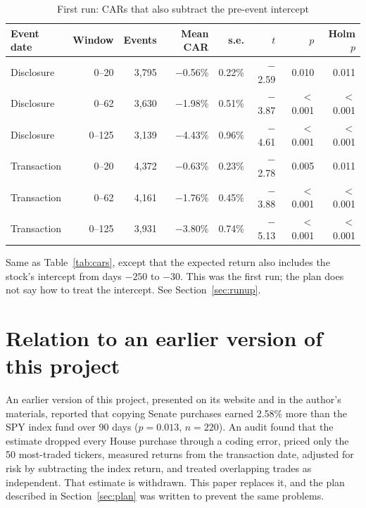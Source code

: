 \documentclass[11pt]{article}
\newcommand{\m}{\ensuremath{-}}
\begin{document}
\begin{table}[H]
\centering
\caption{First run: CARs that also subtract the pre-event intercept}\label{tab:firstrun}
\begin{tabular}{lrrrrrrr}
\toprule
Event date & Window & Events & Mean CAR & s.e. & $t$ & $p$ & Holm $p$ \\
\midrule
Disclosure & 0--20 & 3,795 & \m0.56\% & 0.22\% & \m2.59 & 0.010 & 0.011 \\
Disclosure & 0--62 & 3,630 & \m1.98\% & 0.51\% & \m3.87 & $<$0.001 & $<$0.001 \\
Disclosure & 0--125 & 3,139 & \m4.43\% & 0.96\% & \m4.61 & $<$0.001 & $<$0.001 \\
Transaction & 0--20 & 4,372 & \m0.63\% & 0.23\% & \m2.78 & 0.005 & 0.011 \\
Transaction & 0--62 & 4,161 & \m1.76\% & 0.45\% & \m3.88 & $<$0.001 & $<$0.001 \\
Transaction & 0--125 & 3,931 & \m3.80\% & 0.74\% & \m5.13 & $<$0.001 & $<$0.001 \\
\bottomrule
\end{tabular}

\smallskip
\parbox{0.9\linewidth}{\footnotesize Same as Table~\ref{tab:cars}, except that the expected return also includes the stock's intercept from days $-250$ to $-30$. This was the first run; the plan does not say how to treat the intercept. See Section~\ref{sec:runup}.}
\end{table}

\section{Relation to an earlier version of this project}\label{app:earlier}

An earlier version of this project, presented on its website and in the author's materials, reported that copying Senate purchases earned 2.58\% more than the SPY index fund over 90 days ($p = 0.013$, $n = 220$). An audit found that the estimate dropped every House purchase through a coding error, priced only the 50 most-traded tickers, measured returns from the transaction date, adjusted for risk by subtracting the index return, and treated overlapping trades as independent. That estimate is withdrawn. This paper replaces it, and the plan described in Section~\ref{sec:plan} was written to prevent the same problems.
\end{document}
